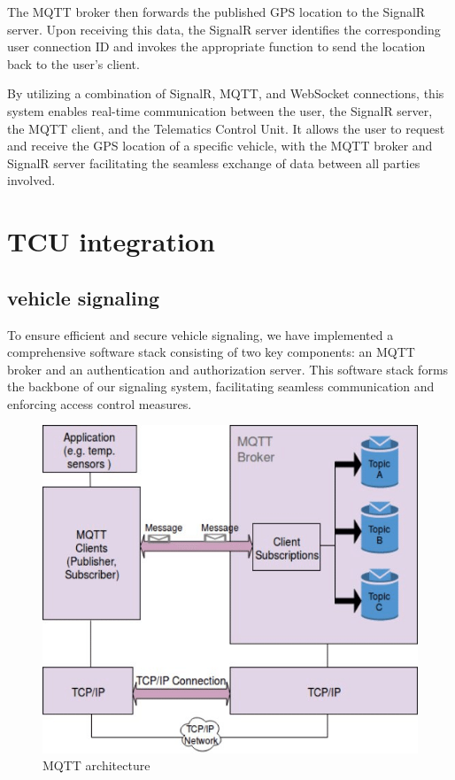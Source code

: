 \documentclass[
12pt,
oneside, 
onehalfspacing, 
nolistspacing, 
parskip, 
chapterinoneline, 
]{AASTCOMPUTER}
\begin{document}
The MQTT broker then forwards the published GPS location to the SignalR server. Upon receiving this data, the SignalR server identifies the corresponding user connection ID and invokes the appropriate function to send the location back to the user's client.

By utilizing a combination of SignalR, MQTT, and WebSocket connections, this system enables real-time communication between the user, the SignalR server, the MQTT client, and the Telematics Control Unit. It allows the user to request and receive the GPS location of a specific vehicle, with the MQTT broker and SignalR server facilitating the seamless exchange of data between all parties involved.

\chapter{TCU integration}
\section{vehicle signaling}
To ensure efficient and secure vehicle signaling, we have implemented a comprehensive software stack consisting of two key components: an MQTT broker and an authentication and authorization server. This software stack forms the backbone of our signaling system, facilitating seamless communication and enforcing access control measures.


\begin{figure}[!ht]
	\centering
	\includegraphics[scale=0.5]{Figures/Architicture/mqtt.png}
  	\caption{MQTT architecture}
  	\label{fig:MQTT architecture}
\end{figure}
\end{document}
